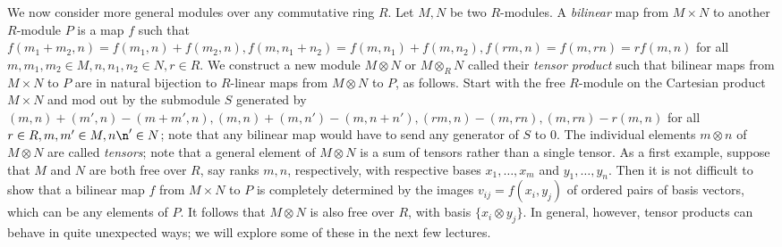 We now consider more general modules over any commutative ring $R$.  Let $M,N$ be two $R$-modules.  A {\sl bilinear} map from $M\times N$ to another $R$-module $P$ is a map $f$ such that
$f(m_1+m_2,n) = f(m_1,n)+f(m_2,n), f(m,n_1+n_2) = f(m,n_1)+f(m,n_2), f(rm,n) = f(m,rn) = rf(m,n)$ for all $m,m_1,m_2\in M, n,n_1,n_2\in N, r\in R$.  We construct a new module $M\otimes N$ or $M\otimes_R N$ called their {\sl tensor product} such that bilinear maps from $M\times N$ to $P$ are in natural bijection to $R$-linear maps from $M\otimes N$ to $P$, as follows.  Start with the free $R$-module on the Cartesian product $M\times N$ and mod out by the submodule $S$ generated by  $(m,n) + (m',n) - (m+m',n), (m,n) + (m,n') - (m,n+n'), (rm,n) - (m,rn),(m,rn) - r(m,n)$ for all $r\in R,m,m'\in M, n\n'\in N$; note that any bilinear map would have to send any generator of $S$ to 0.  The individual elements $m\otimes n$ of $M\otimes N$ are called {\sl tensors}; note that a general element of $M\otimes N$ is a sum of tensors rather than a single tensor.  As a first example, suppose that $M$ and $N$ are both free over $R$, say ranks $m,n$, respectively, with respective bases $x_1,\ldots,x_m$ and $y_1,\ldots,y_n$.  Then it is not difficult to show that a bilinear map $f$ from
$M\times N$ to $P$ is completely determined by the images $v_{ij}=f(x_i,y_j)$ of ordered pairs of basis vectors, which can be any elements of $P$.  It follows that $M\otimes N$ is also free over $R$, with basis $\{x_ i\otimes y_j\}$.  In general, however, tensor products can behave in quite unexpected ways; we will explore some of these in the next few lectures. 